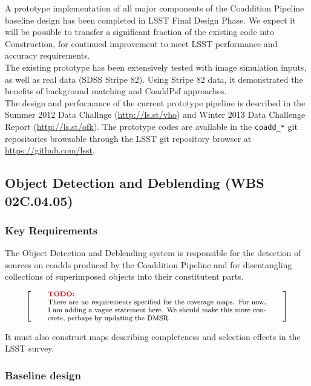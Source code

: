 \documentclass[12pt]{article}
\newcommand{\wbsDetDeblend}{WBS 02C.04.05}
\newenvironment{note}[1][Note]
{
  \begin{displaymath}
    \left[ \qquad
    \begin{minipage}[h]{.75\linewidth}
      \color{red} \footnotesize
      \textbf{#1:} \newline
      \color{black}
}
{
    \end{minipage}
    \normalsize
    \qquad \right]
  \end{displaymath}
}
\begin{document}
A prototype implementation of all major components of the Coaddition Pipeline baseline design has been completed in LSST Final Design Phase. We expect it will be possible to transfer a significant fraction of the existing code into Construction, for continued improvement to meet LSST performance and accuracy requirements.
\\

The existing prototype has been extensively tested with image simulation inputs, as well as real data (SDSS Stripe 82). Using Stripe 82 data, it demonstrated the benefits of background matching and CoaddPsf approaches.
\\

The design and performance of the current prototype pipeline is described in the Summer 2012 Data Challnge (\url{http://ls.st/vho}) and Winter 2013 Data Challenge Report (\url{http://ls.st/ofk}). The prototype codes are available in the {\tt coadd\_*} git repositories browsable through the LSST git repository browser at \url{https://github.com/lsst}.

\clearpage

\subsection{Object Detection and Deblending (\wbsDetDeblend)}

\subsubsection{Key Requirements}

The Object Detection and Deblending system is responsible for the detection of
sources on coadds produced by the Coaddition Pipeline and for disentangling
collections of superimposed objects into their constitutent parts.

\begin{note}[TODO]
There are no requirements specified for the coverage maps. For now, I am adding a vague statement here. We should make this more concrete, perhaps by updating the DMSR.
\end{note}

It must also construct maps describing completeness and selection effects in
the LSST survey.

\subsubsection{Baseline design}
\end{document}
